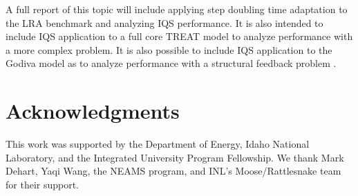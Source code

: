 \documentclass{anstrans}
\begin{document}
A full report of this topic will include applying step doubling time adaptation to the LRA benchmark and analyzing IQS performance.  It is also intended to include IQS application to a full core TREAT model to analyze performance with a more complex problem.  It is also possible to include IQS application to the Godiva model as to analyze performance with a structural feedback problem \cite{CritSafetyHandbook}. 


\section{Acknowledgments}
This work was supported by the Department of Energy, Idaho National Laboratory, and the Integrated University Program Fellowship.  
We thank Mark Dehart, Yaqi Wang, the NEAMS program, and INL's Moose/Rattlesnake team for their support.



\end{document}
